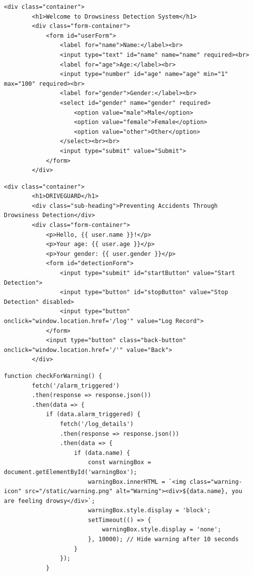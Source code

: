 \documentclass[12pt]{article}
\begin{document}
\begin{lstlisting}[style=mystyle, caption={Index Page}, label=lst:python]
<div class="container">
        <h1>Welcome to Drowsiness Detection System</h1>
        <div class="form-container">
            <form id="userForm">
                <label for="name">Name:</label><br>
                <input type="text" id="name" name="name" required><br>
                <label for="age">Age:</label><br>
                <input type="number" id="age" name="age" min="1" max="100" required><br>
                <label for="gender">Gender:</label><br>
                <select id="gender" name="gender" required>
                    <option value="male">Male</option>
                    <option value="female">Female</option>
                    <option value="other">Other</option>
                </select><br><br>
                <input type="submit" value="Submit">
            </form>
        </div>

\end{lstlisting}



\begin{lstlisting}[style=mystyle, caption={Main Page Intro.}, label=lst:python]
<div class="container">
        <h1>DRIVEGUARD</h1>
        <div class="sub-heading">Preventing Accidents Through Drowsiness Detection</div>
        <div class="form-container">
            <p>Hello, {{ user.name }}!</p>
            <p>Your age: {{ user.age }}</p>
            <p>Your gender: {{ user.gender }}</p>
            <form id="detectionForm">
                <input type="submit" id="startButton" value="Start Detection">
                <input type="button" id="stopButton" value="Stop Detection" disabled>
                <input type="button" onclick="window.location.href='/log'" value="Log Record">
            </form>
            <input type="button" class="back-button" onclick="window.location.href='/'" value="Back">
        </div>
\end{lstlisting}



\begin{lstlisting}[style=mystyle, caption={Drowsiness Warning Prompt}, label=lst:python]
function checkForWarning() {
        fetch('/alarm_triggered')
        .then(response => response.json())
        .then(data => {
            if (data.alarm_triggered) {
                fetch('/log_details')
                .then(response => response.json())
                .then(data => {
                    if (data.name) {
                        const warningBox = document.getElementById('warningBox');
                        warningBox.innerHTML = `<img class="warning-icon" src="/static/warning.png" alt="Warning"><div>${data.name}, you are feeling drowsy</div>`;
                        warningBox.style.display = 'block';
                        setTimeout(() => {
                            warningBox.style.display = 'none';
                        }, 10000); // Hide warning after 10 seconds
                    }
                });
            }
\end{lstlisting}
\end{document}
